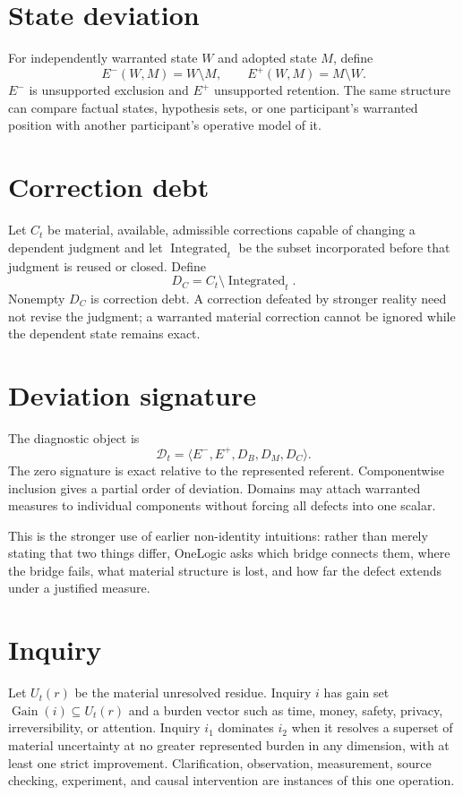 \documentclass[11pt]{article}
\begin{document}
\section{State deviation}
For independently warranted state $W$ and adopted state $M$, define
\[
E^-(W,M)=W\setminus M,
\qquad
E^+(W,M)=M\setminus W.
\]
$E^-$ is unsupported exclusion and $E^+$ unsupported retention. The same structure can compare factual states, hypothesis sets, or one participant's warranted position with another participant's operative model of it.

\section{Correction debt}
Let $C_t$ be material, available, admissible corrections capable of changing a dependent judgment and let $\operatorname{Integrated}_t$ be the subset incorporated before that judgment is reused or closed. Define
\[
D_C=C_t\setminus\operatorname{Integrated}_t.
\]
Nonempty $D_C$ is correction debt. A correction defeated by stronger reality need not revise the judgment; a warranted material correction cannot be ignored while the dependent state remains exact.

\section{Deviation signature}
The diagnostic object is
\[
\mathcal D_t=\langle E^-,E^+,D_B,D_M,D_C\rangle.
\]
The zero signature is exact relative to the represented referent. Componentwise inclusion gives a partial order of deviation. Domains may attach warranted measures to individual components without forcing all defects into one scalar.

This is the stronger use of earlier non-identity intuitions: rather than merely stating that two things differ, OneLogic asks which bridge connects them, where the bridge fails, what material structure is lost, and how far the defect extends under a justified measure.

\section{Inquiry}
Let $U_t(r)$ be the material unresolved residue. Inquiry $i$ has gain set $\operatorname{Gain}(i)\subseteq U_t(r)$ and a burden vector such as time, money, safety, privacy, irreversibility, or attention. Inquiry $i_1$ dominates $i_2$ when it resolves a superset of material uncertainty at no greater represented burden in any dimension, with at least one strict improvement. Clarification, observation, measurement, source checking, experiment, and causal intervention are instances of this one operation.
\end{document}
